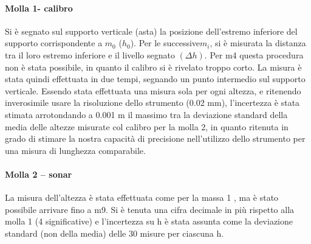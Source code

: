 \documentclass{article}
\begin{document}
\paragraph{Molla 1- calibro}
Si è segnato sul supporto verticale (asta) la posizione dell'estremo inferiore del supporto corrispondente a $m_0$ ($h_0$). Per le successive$ m_i$, si è misurata la distanza tra il loro estremo inferiore e il livello segnato $(\Delta h)$. Per m4 questa procedura non è stata possibile, in quanto il calibro si è rivelato troppo corto. La misura è stata quindi effettuata in due tempi, segnando un punto intermedio sul supporto verticale. Essendo stata effettuata una misura sola per ogni altezza, e ritenendo inverosimile usare la risoluzione dello strumento (0.02 mm), l'incertezza è stata stimata arrotondando a 0.001 m il massimo tra la deviazione standard della media delle altezze misurate col calibro per la molla 2, in quanto ritenuta in grado di stimare la nostra capacità di precisione nell'utilizzo dello strumento per una misura di lunghezza comparabile. 
\paragraph{Molla 2 – sonar}
La misura dell'altezza è stata effettuata come per la massa 1 , ma è stato possibile arrivare fino a m9. Si è tenuta una cifra decimale in più rispetto alla molla 1 (4 significative) e l'incertezza su h è stata assunta come la deviazione standard (non della media) delle 30 misure per ciascuna h. 
\end{document}
